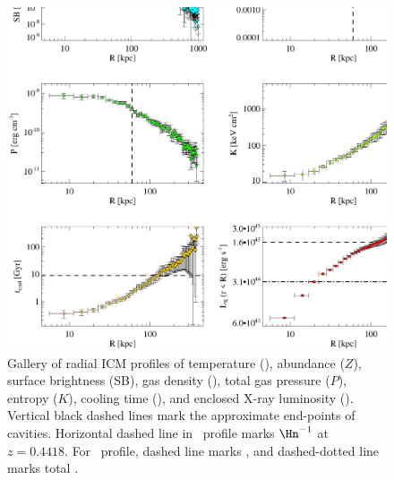 \begin{figure}
  \begin{center}
    \begin{minipage}{0.9\linewidth}
      \includegraphics*[width=\textwidth, trim=6mm 0mm 6mm 6mm, clip]{iras09_nhfro.eps}
      \caption{Gallery of radial ICM profiles of temperature (\tx),
        abundance ($Z$), surface brightness (SB), gas density
        (\nelec), total gas pressure ($P$), entropy ($K$), cooling
        time (\tcool), and enclosed X-ray luminosity (\lx). Vertical
        black dashed lines mark the approximate end-points of
        cavities. Horizontal dashed line in \tcool\ profile marks
        $\Hn^{-1}$ at $z=0.4418$. For \lx\ profile, dashed line marks
        \lcool, and dashed-dotted line marks total \pcav.}
      \label{fig:gallery}
    \end{minipage}
  \end{center}
\end{figure}


